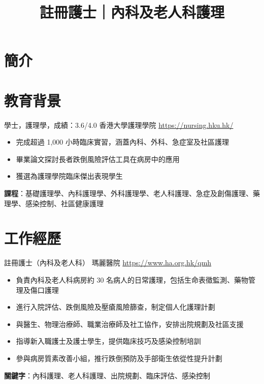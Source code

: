 \documentclass[a4paper, serif, 10pt]{moderncv}
\title{註冊護士｜內科及老人科護理}
\begin{document}
\maketitle

\section{簡介}

\section{教育背景}

        {學士，護理學，成績：3.6/4.0}
        {香港大學護理學院}
        {\url{https://nursing.hku.hk/}}
        {}
        {\begin{itemize}
\item 完成超過 1,000 小時臨床實習，涵蓋內科、外科、急症室及社區護理
\item 畢業論文探討長者跌倒風險評估工具在病房中的應用
\item 獲選為護理學院臨床傑出表現學生
\end{itemize}
\textbf{課程}：基礎護理學、內科護理學、外科護理學、老人科護理、急症及創傷護理、藥理學、感染控制、社區健康護理}
\section{工作經歷}

        {註冊護士（內科及老人科）}
        {瑪麗醫院}
        {\url{https://www.ha.org.hk/qmh}}
        {}
        {\begin{itemize}
\item 負責內科及老人科病房約 30 名病人的日常護理，包括生命表徵監測、藥物管理及傷口護理
\item 進行入院評估、跌倒風險及壓瘡風險篩查，制定個人化護理計劃
\item 與醫生、物理治療師、職業治療師及社工協作，安排出院規劃及社區支援
\item 指導新入職護士及護士學生，提供臨床技巧及感染控制培訓
\item 參與病房質素改善小組，推行跌倒預防及手部衛生依從性提升計劃
\end{itemize}
\textbf{關鍵字}：內科護理、老人科護理、出院規劃、臨床評估、感染控制}
\end{document}
